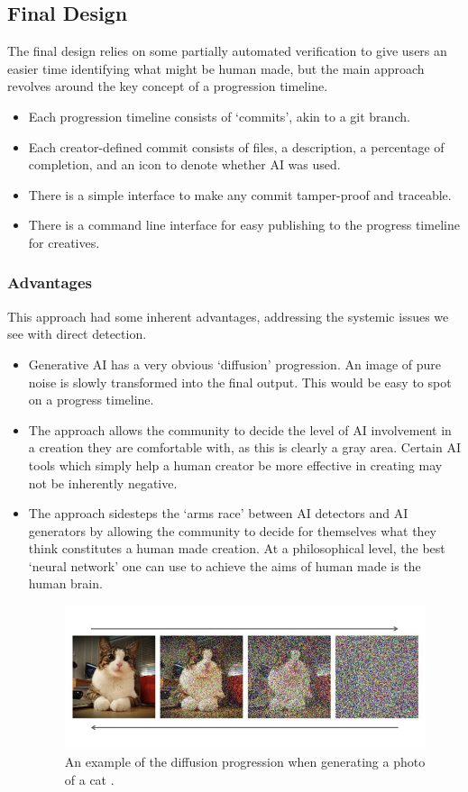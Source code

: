 \documentclass[12pt,a4paper]{article}
\begin{document}
\subsection{Final Design}
The final design relies on some partially automated verification to give users an easier time identifying what might be human made, but the main approach revolves around the key concept of a progression timeline. 
\begin{itemize}
    \item Each progression timeline consists of `commits', akin to a git branch.
    \item Each creator-defined commit consists of files, a description, a percentage of completion, and an icon to denote whether AI was used.
    \item There is a simple interface to make any commit tamper-proof and traceable.
    \item There is a command line interface for easy publishing to the progress timeline for creatives.
\end{itemize}
\subsubsection{Advantages}
This approach had some inherent advantages, addressing the systemic issues we see with direct detection.
\begin{itemize}
    \item Generative AI has a very obvious `diffusion' progression. An image of pure noise is slowly transformed into the final output. This would be easy to spot on a progress timeline.
    \item The approach allows the community to decide the level of AI involvement in a creation they are comfortable with, as this is clearly a gray area. Certain AI tools which simply help a human creator be more effective in creating may not be inherently negative.
    \item The approach sidesteps the `arms race' between AI detectors and AI generators by allowing the community to decide for themselves what they think constitutes a human made creation. At a philosophical level, the best `neural network' one can use to achieve the aims of human made is the human brain.
    \begin{figure}[h]
        \centering
        \includegraphics[scale=0.3]{catDiffusion.jpg}
        \caption{An example of the diffusion progression when generating a photo of a cat \cite{cat}.}
    \end{figure}
\end{itemize}
\end{document}
